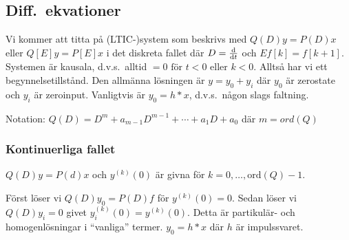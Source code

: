 \documentclass[a4paper]{article}
\begin{document}
\providecommand\fname{}
\renewcommand\fname{19-09-10}

\subsection{Diff.\ ekvationer}
Vi kommer att titta på (LTIC-)system som beskrivs med \(
    Q(D)y = P(D)x
\) eller \(
    Q[E]y = P[E]x
\) i det diskreta fallet där \(
    D = \dv{t}
\) och \(
    Ef[k] = f[k+1]
\). Systemen är kausala, d.v.s.\ alltid \(
    = 0 \text{ för } t < 0 \text{ eller } k < 0
\). Alltså har vi ett begynnelsetillstånd. Den allmänna lösningen är \(
    y = y_0 + y_i
\) där \(
    y_0
\) är zerostate och \(
    y_i
\) är zeroinput. Vanligtvis är \(
    y_0 = h * x
\), d.v.s.\ någon slags faltning. 

Notation: \(
    Q(D) = D^m + a_{m-1}D^{m-1}+\cdots+a_1D+a_0
\) där \(
    m = ord(Q)
\) 

\subsubsection{Kontinuerliga fallet}
\(
    Q(D)y = P(d)x
\) och \(
    y^{(k)}(0) 
\) är givna för \(
    k=0, \dots, \text{ord}(Q)-1 
\).

Först löser vi \(
    Q(D)y_0 = P(D)f
\) för \(
    y^{(k)}(0) = 0
\). Sedan löser vi \(
    Q(D)y_i = 0
\) givet \(
    y_i^{(k)}(0) = y^{(k)}(0)
\). Detta är partikulär- och homogenlösningar i \enquote{vanliga} termer.
\(
    y_0 = h*x
\) där \(
    h
\) är impulssvaret.
\end{document}
